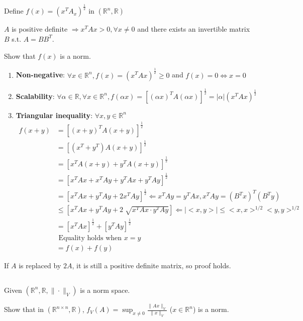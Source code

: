 \documentclass{article}
\theoremstyle{definition} %
\newcommand{\RR}{\mathbb{R}}
\begin{document}
Define $f(x)=\left(x^{T} A_x\right)^{\frac{1}{2}}$ in $\left(\mathbb{R}^n, \RR\right)$

$A$ is positive definite $\Rightarrow x^{T} A x>0, \forall x \neq 0$ and there exists an invertible matrix $B$ s.t. $A=BB^T$.

Show that $f(x)$ is a norm.

\begin{enumerate}[label=(\alph*)]
	\item \textbf{Non-negative}: $\forall x \in \mathbb{R}^n, f(x)=\left(x^{T} A x\right)^{\frac{1}{2}} \geqslant 0$ and $f(x)=0 \Leftrightarrow x=0$
	\item \textbf{Scalability}: $\forall \alpha \in \mathbb{R}, \forall x \in \mathbb{R}^n, f(\alpha x)=\left[(\alpha x)^{T} A(\alpha x)\right]^{\frac{1}{2}}=|\alpha|\left(x^{T} A x\right)^{\frac{1}{2}}$
	\item \textbf{Triangular inequality}: $\forall x, y \in \mathbb{R}^n$
	\begin{align*}
		f(x+y)&=\left[(x+y)^{T} A(x+y)\right]^{\frac{1}{2}}\\
		&=\left[\left(x^{T}+y^{T}\right) A(x+y)\right]^{\frac{1}{2}}\\
		&=\left[x^{T} A(x+y)+y^{T} A(x+y)\right]^{\frac{1}{2}}\\
		&=\left[x^{T} A x+x^{T} A y+y^{T} A x+y^{T} A y\right]^{\frac{1}{2}}\\
		&=\left[x^{T} A x + y^{T} A y + 2x^{T} A y\right]^{\frac{1}{2}}
		\Leftarrow x^TAy = y^TAx, x^TAy = (B^Tx)^T(B^Ty)\\
		&\leq \left[x^{T} A x + y^{T} A y + 2\sqrt[]{x^{T} A x \cdot y^{T} A y}\right]
		\Leftarrow \left|<x,y>\right|\leq <x,x>^{1/2}<y,y>^{1/2}\\
		&=\left[x^{T} A x\right]^{\frac{1}{2}}+\left[y^{T}A y\right]^{\frac{1}{2}}\\
		&\text { Equality holds when } x=y\\
		&=f(x)+f(y)
	\end{align*}
\end{enumerate}
If $A$ is replaced by $2A$, it is still a positive definite matrix, so proof holds.

\subsection{}
Given $(\RR^n, \RR, \|\cdot \|_V)$ is a norm space.

Show that in $(\RR^{n\times n}, \RR)$, $f_V(A) = \sup _{x\neq 0} \frac{\|Ax\|_V}{\|x\|_V}$ ($x\in \RR^n$) is a norm.
\end{document}

